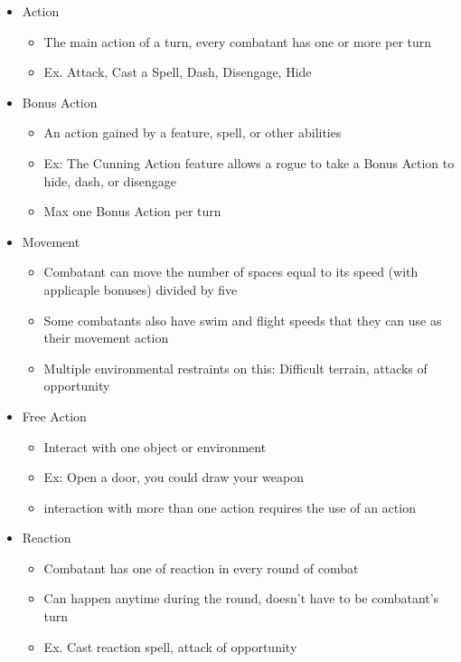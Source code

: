 \documentclass[12pt,a4paper]{report}
\begin{document}
	\begin{itemize}
		\item Action
			\begin{itemize}
				\item The main action of a turn, every combatant has one or more per turn
				\item Ex. Attack, Cast a Spell, Dash, Disengage, Hide
			\end{itemize}
		\item Bonus Action
			\begin{itemize}
				\item An action gained by a feature, spell, or other abilities
				\item Ex: The Cunning Action feature allows a rogue to take a Bonus Action to hide, dash, or disengage
				\item Max one Bonus Action per turn
			\end{itemize}
		\item Movement
			\begin{itemize}
				\item Combatant can move the number of spaces equal to its speed (with applicaple bonuses) divided by five
				\item Some combatants also have swim and flight speeds that they can use as their movement action
				\item Multiple environmental restraints on this: Difficult terrain, attacks of opportunity
			\end{itemize}
		\item Free Action
			\begin{itemize}
				\item Interact with one object or environment 
				\item Ex: Open a door, you could draw your weapon
				\item interaction with more than one action requires the use of an action
			\end{itemize}
		\item Reaction
			\begin{itemize}
				\item Combatant has one of reaction in every round of combat
				\item Can happen anytime during the round, doesn't have to be combatant's turn
				\item Ex. Cast reaction spell, attack of opportunity
			\end{itemize}
	\end{itemize}
\end{document}
